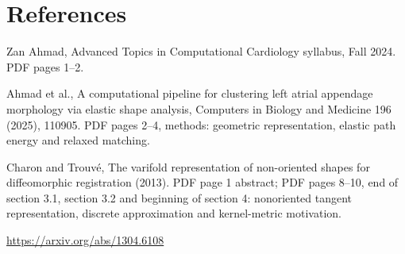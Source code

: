 \documentclass[11pt,letterpaper]{article}
\theoremstyle{definition}\newtheorem{definition}{Definition}\newtheorem{example}{Example}
\numberwithin{equation}{section}
\begin{document}
\section*{References}
\noindent\begin{minipage}{\linewidth}
Zan Ahmad, Advanced Topics in Computational Cardiology syllabus, Fall 2024. PDF pages 1--2.

\end{minipage}\par\medskip
\noindent\begin{minipage}{\linewidth}
Ahmad et al., A computational pipeline for clustering left atrial appendage morphology via elastic shape analysis, Computers in Biology and Medicine 196 (2025), 110905. PDF pages 2--4, methods: geometric representation, elastic path energy and relaxed matching.

\end{minipage}\par\medskip
\noindent\begin{minipage}{\linewidth}
Charon and Trouvé, The varifold representation of non-oriented shapes for diffeomorphic registration (2013). PDF page 1 abstract; PDF pages 8--10, end of section 3.1, section 3.2 and beginning of section 4: nonoriented tangent representation, discrete approximation and kernel-metric motivation.

\url{https://arxiv.org/abs/1304.6108}
\end{minipage}\par\medskip
\end{document}
